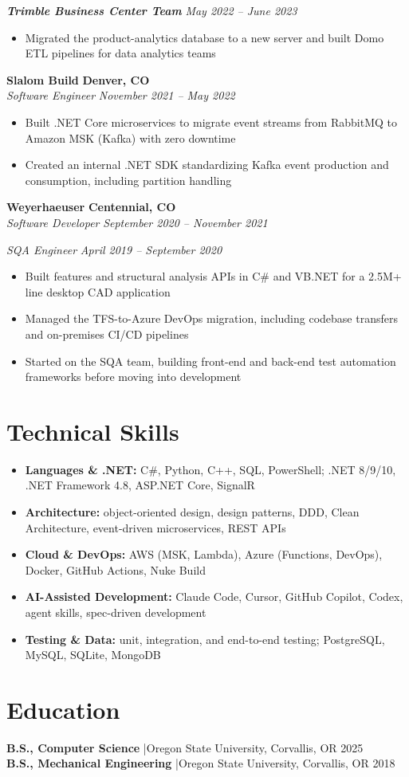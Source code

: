 \documentclass[10pt,letterpaper]{article}
\newcommand{\sep}{\hspace{0.6em}|\hspace{0.6em}}
\newcommand{\resumeSubheading}[4]{%
  \textbf{#1} \hfill \textbf{#2} \\
  \textit{#3} \hfill \textit{#4} \par
}
\newcommand{\resumeTeam}[2]{%
  \vspace{3pt}\textbf{\textit{#1}} \hfill \textit{#2} \par
}
\begin{document}
\resumeTeam{Trimble Business Center Team}{May 2022 -- June 2023}
\begin{itemize}
  \item Migrated the product-analytics database to a new server and built Domo ETL pipelines for data analytics teams
\end{itemize}

\vspace{3pt}
\resumeSubheading{Slalom Build}{Denver, CO}{Software Engineer}{November 2021 -- May 2022}
\begin{itemize}
  \item Built .NET Core microservices to migrate event streams from RabbitMQ to Amazon MSK (Kafka) with zero downtime
  \item Created an internal .NET SDK standardizing Kafka event production and consumption, including partition handling
\end{itemize}

\vspace{3pt}
\resumeSubheading{Weyerhaeuser}{Centennial, CO}{Software Developer}{September 2020 -- November 2021}
\textit{SQA Engineer} \hfill \textit{April 2019 -- September 2020} \par
\begin{itemize}
  \item Built features and structural analysis APIs in C\# and VB.NET for a 2.5M+ line desktop CAD application
  \item Managed the TFS-to-Azure DevOps migration, including codebase transfers and on-premises CI/CD pipelines
  \item Started on the SQA team, building front-end and back-end test automation frameworks before moving into development
\end{itemize}

\section{Technical Skills}
\begin{itemize}[label={},leftmargin=0pt,itemsep=1pt]
  \item \textbf{Languages \& .NET:} C\#, Python, C++, SQL, PowerShell; .NET 8/9/10, .NET Framework 4.8, ASP.NET Core, SignalR
  \item \textbf{Architecture:} object-oriented design, design patterns, DDD, Clean Architecture, event-driven microservices, REST APIs
  \item \textbf{Cloud \& DevOps:} AWS (MSK, Lambda), Azure (Functions, DevOps), Docker, GitHub Actions, Nuke Build
  \item \textbf{AI-Assisted Development:} Claude Code, Cursor, GitHub Copilot, Codex, agent skills, spec-driven development
  \item \textbf{Testing \& Data:} unit, integration, and end-to-end testing; PostgreSQL, MySQL, SQLite, MongoDB
\end{itemize}

\section{Education}
\textbf{B.S., Computer Science} \sep Oregon State University, Corvallis, OR \hfill 2025 \\
\textbf{B.S., Mechanical Engineering} \sep Oregon State University, Corvallis, OR \hfill 2018
\end{document}
